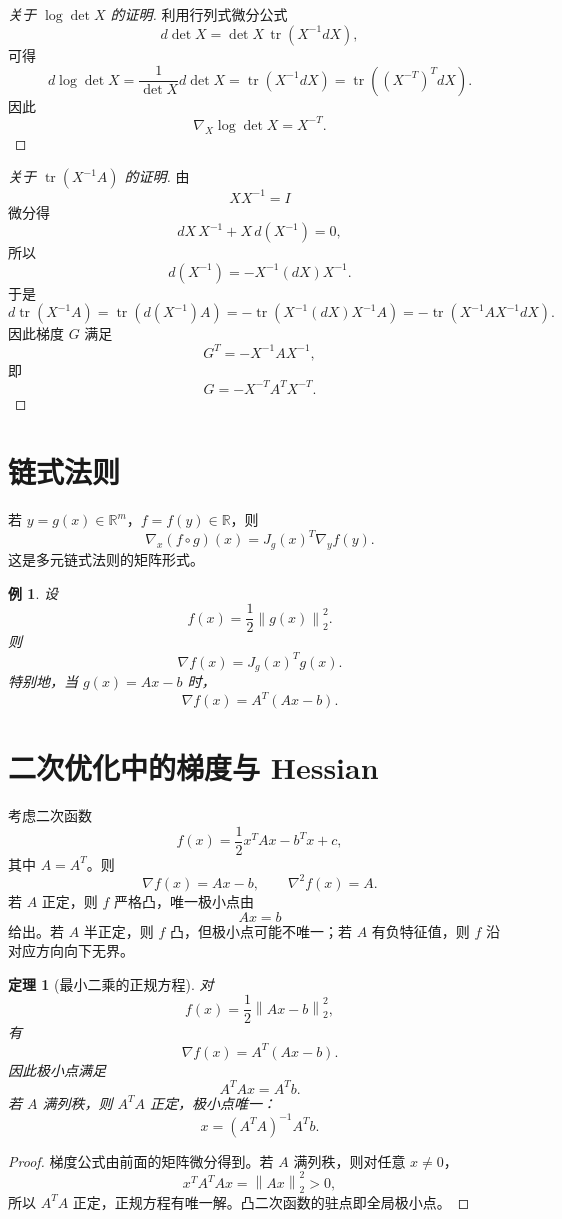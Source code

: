 \documentclass[UTF8,openany,zihao=-4]{ctexbook}
\theoremstyle{cnplain}
\newtheorem{theorem}{定理}[chapter]
\newtheorem{example}{例}[chapter]
\newcommand{\R}{\mathbb R}
\newcommand{\tr}{\operatorname{tr}}
\newcommand{\norm}[1]{\left\lVert #1\right\rVert}
\begin{document}
\begin{proof}[关于 $\log\det X$ 的证明]
利用行列式微分公式
\[
d\det X=\det X\,\tr(X^{-1}dX),
\]
可得
\[
d\log\det X=\frac{1}{\det X}d\det X
=\tr(X^{-1}dX)=\tr((X^{-T})^TdX).
\]
因此
\[
\nabla_X\log\det X=X^{-T}.
\]
\end{proof}

\begin{proof}[关于 $\tr(X^{-1}A)$ 的证明]
由
\[
X X^{-1}=I
\]
微分得
\[
dX\,X^{-1}+X\,d(X^{-1})=0,
\]
所以
\[
d(X^{-1})=-X^{-1}(dX)X^{-1}.
\]
于是
\[
d\tr(X^{-1}A)
=\tr(d(X^{-1})A)
=-\tr(X^{-1}(dX)X^{-1}A)
=-\tr(X^{-1}AX^{-1}dX).
\]
因此梯度 $G$ 满足
\[
G^T=-X^{-1}AX^{-1},
\]
即
\[
G=-X^{-T}A^TX^{-T}.
\]
\end{proof}

\section{链式法则}

若 $y=g(x)\in\R^m$，$f=f(y)\in\R$，则
\[
\nabla_x(f\circ g)(x)=J_g(x)^T\nabla_y f(y).
\]
这是多元链式法则的矩阵形式。

\begin{example}
设
\[
f(x)=\frac12\norm{g(x)}_2^2.
\]
则
\[
\nabla f(x)=J_g(x)^Tg(x).
\]
特别地，当 $g(x)=Ax-b$ 时，
\[
\nabla f(x)=A^T(Ax-b).
\]
\end{example}

\section{二次优化中的梯度与 Hessian}

考虑二次函数
\[
f(x)=\frac12x^TAx-b^Tx+c,
\]
其中 $A=A^T$。则
\[
\nabla f(x)=Ax-b,
\qquad
\nabla^2 f(x)=A.
\]
若 $A$ 正定，则 $f$ 严格凸，唯一极小点由
\[
Ax=b
\]
给出。若 $A$ 半正定，则 $f$ 凸，但极小点可能不唯一；若 $A$ 有负特征值，则 $f$ 沿对应方向向下无界。

\begin{theorem}[最小二乘的正规方程]
对
\[
f(x)=\frac12\norm{Ax-b}_2^2,
\]
有
\[
\nabla f(x)=A^T(Ax-b).
\]
因此极小点满足
\[
A^TAx=A^Tb.
\]
若 $A$ 满列秩，则 $A^TA$ 正定，极小点唯一：
\[
x=(A^TA)^{-1}A^Tb.
\]
\end{theorem}

\begin{proof}
梯度公式由前面的矩阵微分得到。若 $A$ 满列秩，则对任意 $x\ne0$，
\[
x^TA^TAx=\norm{Ax}_2^2>0,
\]
所以 $A^TA$ 正定，正规方程有唯一解。凸二次函数的驻点即全局极小点。
\end{proof}
\end{document}
